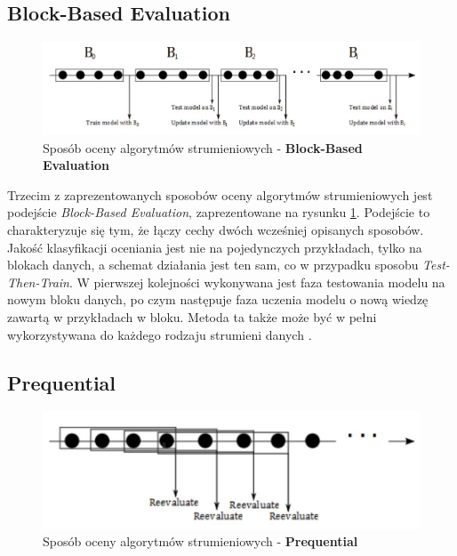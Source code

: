 \subsection{Block-Based Evaluation}

\begin{figure}[h] 
    \centering
    \includegraphics[width=15cm]{figures/block_processing.JPG}
    \caption{Sposób oceny algorytmów strumieniowych - \textbf{Block-Based Evaluation} \cite{Prezentacja:Strumienie}}\label{Figure:BlockBasedEvaluation}
\end{figure}

\noindent Trzecim z zaprezentowanych sposobów oceny algorytmów strumieniowych jest podejście \textit{Block-Based Evaluation}, zaprezentowane na rysunku \ref{Figure:BlockBasedEvaluation}. Podejście to charakteryzuje się tym, że łączy cechy dwóch wcześniej opisanych sposobów. Jakość klasyfikacji oceniania jest nie na pojedynczych przykładach, tylko na blokach danych, a schemat działania jest ten sam, co w przypadku sposobu \textit{Test-Then-Train}. W pierwszej kolejności wykonywana jest faza testowania modelu na nowym bloku danych, po czym następuje faza uczenia modelu o nową wiedzę zawartą w przykładach w bloku. Metoda ta także może być w pełni wykorzystywana do każdego rodzaju strumieni danych \cite{DBrzezinski}.

\subsection{Prequential}

\begin{figure}[h] 
    \centering
    \includegraphics[width=15cm]{figures/prequential.JPG}
    \caption{Sposób oceny algorytmów strumieniowych - \textbf{Prequential} \cite{Prezentacja:Strumienie}}\label{Figure:Prequential}
\end{figure}

